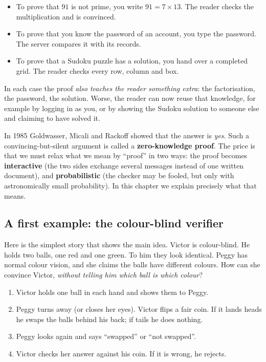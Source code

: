 \documentclass[11pt,a4paper]{report}
\theoremstyle{plain}
\theoremstyle{definition}
\theoremstyle{remark}
\begin{document}
\begin{itemize}
\item To prove that $91$ is not prime, you write $91 = 7 \times 13$. The reader checks the multiplication and is convinced.
\item To prove that you know the password of an account, you type the password. The server compares it with its records.
\item To prove that a Sudoku puzzle has a solution, you hand over a completed grid. The reader checks every row, column and box.
\end{itemize}

In each case the proof \emph{also teaches the reader something extra}: the factorisation, the password, the solution.
Worse, the reader can now reuse that knowledge, for example by logging in as you, or by showing the Sudoku solution to someone else and claiming to have solved it.

\begin{center}
\end{center}

In 1985 Goldwasser, Micali and Rackoff showed that the answer is \emph{yes}. Such a convincing-but-silent argument is called a
\textbf{zero-knowledge proof}. The price is that we must relax what we mean by ``proof'' in two ways:
the proof becomes \textbf{interactive} (the two sides exchange several messages instead of one written document), and
\textbf{probabilistic} (the checker may be fooled, but only with astronomically small probability). In this chapter we explain
precisely what that means.

\subsection{A first example: the colour-blind verifier}\label{sec:colourblind}
Here is the simplest story that shows the main idea. Victor is colour-blind. He holds two balls, one red and one green. To him they look identical.
Peggy has normal colour vision, and she claims the balls have different colours. How can she convince Victor, \emph{without telling him which ball is which colour}?

\begin{enumerate}
\item Victor holds one ball in each hand and shows them to Peggy.
\item Peggy turns away (or closes her eyes). Victor flips a fair coin. If it lands heads he swaps the balls behind his back; if tails he does nothing.
\item Peggy looks again and says ``swapped'' or ``not swapped''.
\item Victor checks her answer against his coin. If it is wrong, he rejects.
\end{enumerate}
\end{document}

